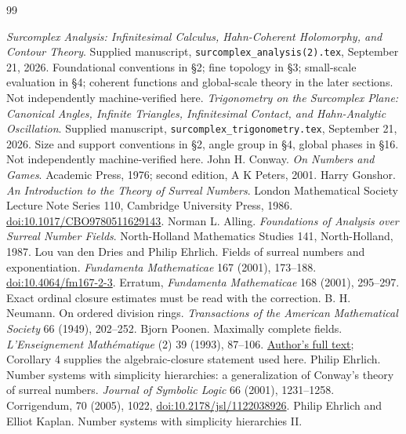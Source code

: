 \documentclass[11pt,letterpaper]{article}
\numberwithin{equation}{section}
\theoremstyle{definition}
\theoremstyle{remark}
\begin{document}
\clearpage
\begingroup\small\setlength{\parskip}{0pt}
\begin{thebibliography}{99}
\setlength{\itemsep}{0.45em}\raggedright
{}
\emph{Surcomplex Analysis: Infinitesimal Calculus, Hahn-Coherent Holomorphy, and Contour Theory}.
Supplied manuscript, \texttt{surcomplex\_analysis(2).tex}, September 21, 2026. Foundational conventions in \S2; fine topology in \S3; small-scale evaluation in \S4; coherent functions and global-scale theory in the later sections. Not independently machine-verified here.
\emph{Trigonometry on the Surcomplex Plane: Canonical Angles, Infinite Triangles, Infinitesimal Contact, and Hahn-Analytic Oscillation}.
Supplied manuscript, \texttt{surcomplex\_trigonometry.tex}, September 21, 2026. Size and support conventions in \S2, angle group in \S4, global phases in \S16. Not independently machine-verified here.
John H. Conway. \emph{On Numbers and Games}. Academic Press, 1976; second edition, A K Peters, 2001.
Harry Gonshor. \emph{An Introduction to the Theory of Surreal Numbers}. London Mathematical Society Lecture Note Series 110, Cambridge University Press, 1986.
\href{https://doi.org/10.1017/CBO9780511629143}{doi:10.1017/CBO9780511629143}.
Norman L. Alling. \emph{Foundations of Analysis over Surreal Number Fields}. North-Holland Mathematics Studies 141, North-Holland, 1987.
Lou van den Dries and Philip Ehrlich. Fields of surreal numbers and exponentiation. \emph{Fundamenta Mathematicae} 167 (2001), 173--188.
\href{https://doi.org/10.4064/fm167-2-3}{doi:10.4064/fm167-2-3}.
Erratum, \emph{Fundamenta Mathematicae} 168 (2001), 295--297. Exact ordinal closure estimates must be read with the correction.
B. H. Neumann. On ordered division rings. \emph{Transactions of the American Mathematical Society} 66 (1949), 202--252.
Bjorn Poonen. Maximally complete fields. \emph{L'Enseignement Math\'ematique} (2) 39 (1993), 87--106.
\href{https://math.mit.edu/~poonen/papers/amsval.pdf}{Author's full text}; Corollary 4 supplies the algebraic-closure statement used here.
Philip Ehrlich. Number systems with simplicity hierarchies: a generalization of Conway's theory of surreal numbers.
\emph{Journal of Symbolic Logic} 66 (2001), 1231--1258. Corrigendum, 70 (2005), 1022,
\href{https://doi.org/10.2178/jsl/1122038926}{doi:10.2178/jsl/1122038926}.
Philip Ehrlich and Elliot Kaplan. Number systems with simplicity hierarchies II.

\end{thebibliography}
\end{document}
